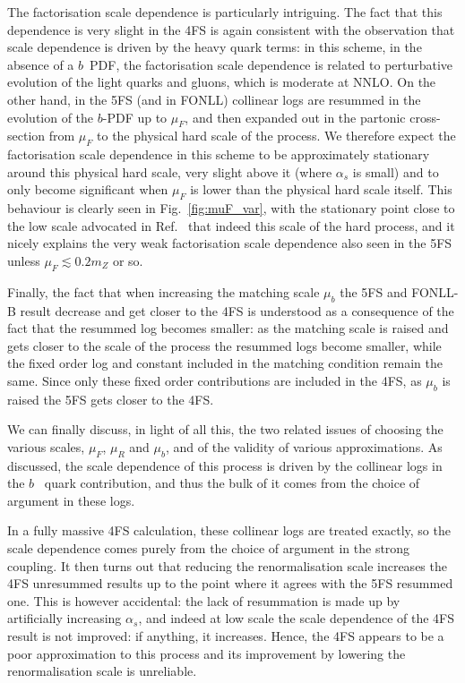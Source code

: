 \documentclass[12pt]{article}
\begin{document}
The factorisation scale dependence is particularly intriguing. The
fact that this dependence is very slight in the 4FS is again consistent
with the observation that scale dependence is driven by the heavy
quark terms: in this scheme, in the absence of a $b$~PDF, the factorisation scale
dependence is  related to perturbative evolution of the light
quarks and gluons, which is moderate at NNLO. 
On the other hand, in the 5FS (and in FONLL) collinear logs are
resummed in the evolution  of the $b$-PDF up to $\mu_F$, and then
expanded out in the partonic cross-section from $\mu_F$ to the
physical hard scale of the process. We therefore expect the
factorisation scale dependence in this scheme to be approximately
stationary around this physical hard scale, very slight above it (where
$\alpha_s$ is small) and to only become significant when $\mu_F$ is
lower than the physical hard scale itself. This behaviour is
clearly seen in Fig.~\ref{fig:muF_var}, with the stationary point
close to the low scale advocated in Ref.~\cite{Maltoni:2012pa,Lim:2016wjo} 
that indeed this scale of the hard process, and it nicely explains the
very weak factorisation scale dependence also seen in the 5FS unless
$\mu_F\lesssim0.2m_Z$ or so.

Finally, the fact that when increasing the matching scale $\mu_b$ the
5FS and FONLL-B result decrease and get closer to the 4FS is
understood as a consequence of the fact that the resummed log becomes
smaller: as the matching scale is raised and gets closer to
the scale of the process the resummed logs become smaller, while the
fixed order log and constant included in the matching condition remain
the same. Since only these 
fixed order contributions are  included in the 4FS, as $\mu_b$ is
raised the 5FS gets closer to the 4FS.

We can finally discuss, in light of all this, the two related issues
of choosing the various scales, $\mu_F$, $\mu_R$ and $\mu_b$, and of
the validity of various approximations. As discussed, the scale
dependence of this process is driven by the collinear logs in the
$b$~ quark contribution, and thus the bulk of it comes from the
choice of argument in these logs. 

In a fully massive 4FS calculation,
these collinear logs are treated exactly, so the scale dependence
comes purely from the choice of argument in the strong coupling. It
then turns out that reducing the renormalisation scale increases the
4FS unresummed results up to the point where it agrees with the 5FS
resummed one. This is however accidental: the lack of resummation is made up
by artificially increasing $\alpha_s$, and indeed at low scale the
scale dependence of the 4FS result is not improved: if anything, it
increases. Hence, the 4FS appears to be a poor approximation to this
process and its improvement by lowering the renormalisation scale  is
unreliable.
\end{document}

